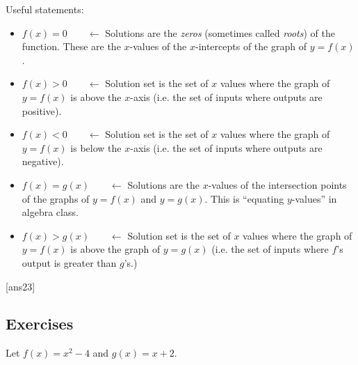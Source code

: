 \documentclass{amsbook}
\numberwithin{section}{chapter}
\numberwithin{equation}{chapter}
\begin{document}
Useful statements:
\begin{itemize}
	\item $f(x)=0$\ \ \ \ $\longleftarrow$ Solutions are the \textit{zeros} (sometimes called \textit{roots}) of the function. These are the $x$-values of the $x$-intercepts of the graph of $y=f(x)$.
	\item $f(x)>0$\ \ \ \ $\longleftarrow$ Solution set is the set of $x$ values where the graph of $y=f(x)$ is above the $x$-axis (i.e. the set of inputs where outputs are positive).
	\item $f(x)<0$\ \ \ \ $\longleftarrow$ Solution set is the set of $x$ values where the graph of $y=f(x)$ is below the $x$-axis (i.e. the set of inputs where outputs are negative).
	\item $f(x)=g(x)$\ \ \ \ $\longleftarrow$ Solutions are the $x$-values of the intersection points of the graphs of $y=f(x)$ and $y=g(x)$. This is ``equating $y$-values'' in algebra class.
	\item $f(x)>g(x)$\ \ \ \ $\longleftarrow$ Solution set is the set of $x$ values where the graph of $y=f(x)$ is above the graph of $y=g(x)$ (i.e. the set of inputs where $f$'s output is greater than $g$'s.)
\end{itemize}

[ans23]
\subsection*{Exercises \nopunct} \hfill

	Let $f(x) = x^2-4$ and $g(x) = x+2$.
	
\end{document}
